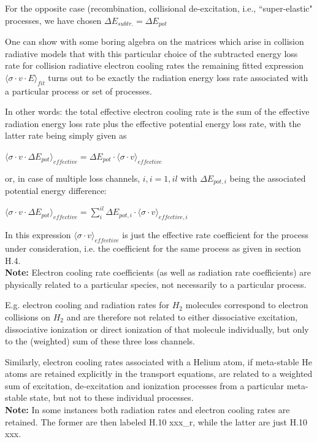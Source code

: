 \documentclass[12pt,dvipdfmx]{article}
\begin{document}
For the opposite case (recombination, collisional de-excitation, i.e., ``super-elastic"
processes, we have chosen $\Delta E_{subtr.} = \Delta E_{pot}$

One can show with some boring algebra on the matrices which arise in collision radiative
models that
with this particular choice of the subtracted energy loss rate for collision radiative
electron cooling rates
the remaining fitted expression $\langle\sigma \cdot v \cdot E \rangle_{fit}$
turns out to be exactly the radiation energy loss rate
associated with a particular process or set of processes.

In other words: the total effective electron cooling rate
is the sum of the effective
radiation energy loss rate
plus the effective potential energy loss rate, with the latter rate being simply
given as

$\langle\sigma \cdot v \cdot \Delta E_{pot} \rangle_{effective} = \Delta E_{pot}
\cdot \langle\sigma \cdot v \rangle_{effective}$

or, in case of multiple loss channels, $i, i=1,il$ with $\Delta E_{pot,i}$ being the associated potential energy
difference:

$\langle\sigma \cdot v \cdot \Delta E_{pot} \rangle_{effective} = \sum_i^{il} \Delta E_{pot,i}
\cdot \langle\sigma \cdot v \rangle_{effective,i}$

In this expression $\langle\sigma \cdot v \rangle_{effective}$
is just the effective rate coefficient
for the process under consideration, i.e. the coefficient for the same process as given
in section H.4.
\\
\textbf{Note:}
Electron cooling rate coefficients (as well as radiation rate coefficients) are physically
related to a particular species, not necessarily to a particular process.

E.g. electron cooling and radiation rates for $H_2$ molecules correspond to electron collisions
on $H_2$ and are therefore not related to either dissociative excitation, dissociative ionization or
direct ionization of that molecule individually, but only to the (weighted) sum of these three loss channels.

Similarly, electron cooling rates associated with a Helium atom, if meta-stable He atoms are retained explicitly
in the transport equations, are related to a weighted sum of excitation, de-excitation and ionization processes
from a particular meta-stable state, but not to these individual processes.
\\
\textbf{Note:}
In some instances both radiation rates and electron cooling rates are retained.
The former are then labeled H.10 xxx\_r, while the latter are just H.10 xxx.
\end{document}
